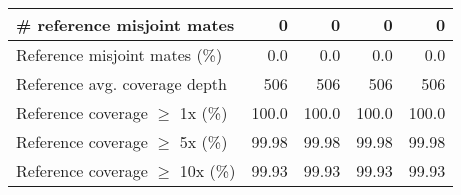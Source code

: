 \documentclass[12pt,a4paper]{article}
\begin{document}
\begin{table}[ht]
\begin{center}
\begin{tabular}{|l*{4}{|r}|}
\# reference misjoint mates & 0 & 0 & 0 & 0 \\ \hline
Reference misjoint mates (\%) & 0.0 & 0.0 & 0.0 & 0.0 \\ \hline
Reference avg. coverage depth & 506 & 506 & 506 & 506 \\ \hline
Reference coverage $\geq$ 1x (\%) & 100.0 & 100.0 & 100.0 & 100.0 \\ \hline
Reference coverage $\geq$ 5x (\%) & 99.98 & 99.98 & 99.98 & 99.98 \\ \hline
Reference coverage $\geq$ 10x (\%) & 99.93 & 99.93 & 99.93 & 99.93 \\ \hline
\end{tabular}
\end{center}
\end{table}
\end{document}
